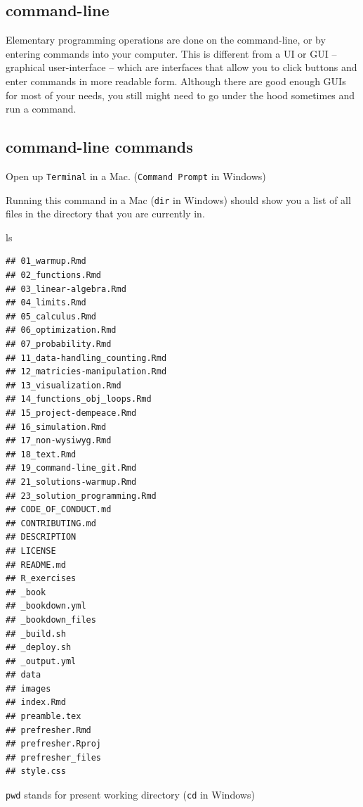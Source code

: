 \documentclass[]{book}
\newenvironment{Shaded}{\begin{snugshade}}{\end{snugshade}}
\newcommand{\FunctionTok}[1]{\textcolor[rgb]{0.00,0.00,0.00}{#1}}
\theoremstyle{definition}
\theoremstyle{definition}
\theoremstyle{definition}
\theoremstyle{remark}
\begin{document}
\begin{Shaded}
\begin{Highlighting}[]
\begin{Shaded}
\begin{Highlighting}[]
\begin{Shaded}
\begin{Highlighting}[]
\hypertarget{command-line}{%
\section{command-line}\label{command-line}}

Elementary programming operations are done on the command-line, or by entering commands into your computer. This is different from a UI or GUI -- graphical user-interface -- which are interfaces that allow you to click buttons and enter commands in more readable form. Although there are good enough GUIs for most of your needs, you still might need to go under the hood sometimes and run a command.

\hypertarget{command-line-commands}{%
\subsection{command-line commands}\label{command-line-commands}}

Open up \texttt{Terminal} in a Mac. (\texttt{Command\ Prompt} in Windows)

Running this command in a Mac (\texttt{dir} in Windows) should show you a list of all files in the directory that you are currently in.

\begin{Shaded}
\begin{Highlighting}[]
\FunctionTok{ls}
\end{Highlighting}
\end{Shaded}

\begin{verbatim}
## 01_warmup.Rmd
## 02_functions.Rmd
## 03_linear-algebra.Rmd
## 04_limits.Rmd
## 05_calculus.Rmd
## 06_optimization.Rmd
## 07_probability.Rmd
## 11_data-handling_counting.Rmd
## 12_matricies-manipulation.Rmd
## 13_visualization.Rmd
## 14_functions_obj_loops.Rmd
## 15_project-dempeace.Rmd
## 16_simulation.Rmd
## 17_non-wysiwyg.Rmd
## 18_text.Rmd
## 19_command-line_git.Rmd
## 21_solutions-warmup.Rmd
## 23_solution_programming.Rmd
## CODE_OF_CONDUCT.md
## CONTRIBUTING.md
## DESCRIPTION
## LICENSE
## README.md
## R_exercises
## _book
## _bookdown.yml
## _bookdown_files
## _build.sh
## _deploy.sh
## _output.yml
## data
## images
## index.Rmd
## preamble.tex
## prefresher.Rmd
## prefresher.Rproj
## prefresher_files
## style.css
\end{verbatim}

\texttt{pwd} stands for present working directory (\texttt{cd} in Windows)


\end{Highlighting}
\end{Shaded}
\end{Highlighting}
\end{Shaded}
\end{Highlighting}
\end{Shaded}
\end{document}
